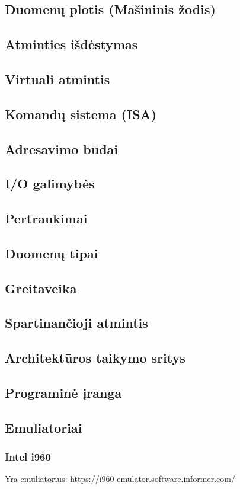 \documentclass{article}
\begin{document}
\subsection{Duomenų plotis (Mašininis žodis)}
\subsection{Atminties išdėstymas}
\subsection{Virtuali atmintis}
\subsection{Komandų sistema (ISA)}
\subsection{Adresavimo būdai}
\subsection{I/O galimybės}
\subsection{Pertraukimai}
\subsection{Duomenų tipai}
\subsection{Greitaveika}
\subsection{Spartinančioji atmintis}
\subsection{Architektūros taikymo sritys}
\subsection{Programinė įranga}
\subsection{Emuliatoriai}
\subsubsection{Intel i960}
Yra emuliatorius: https://i960-emulator.software.informer.com/
\end{document}
